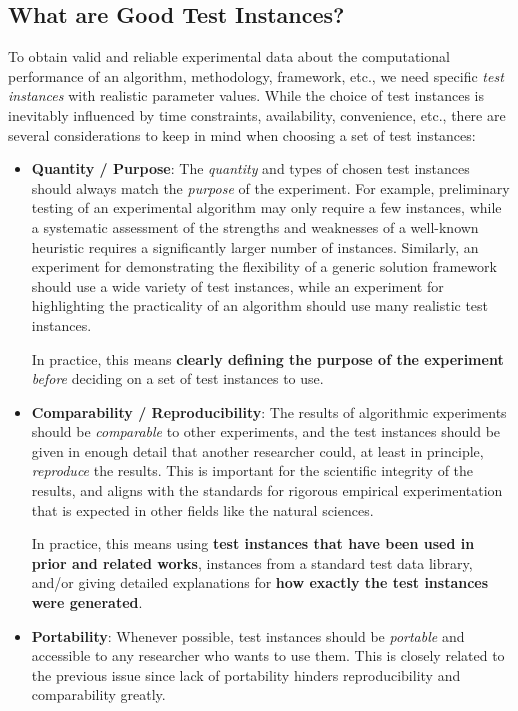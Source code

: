 \documentclass[12pt]{article}
\begin{document}
\subsection{What are Good Test Instances?}
To obtain valid and reliable experimental data about the computational performance of an algorithm, methodology, framework, etc., we need specific \emph{test instances} with realistic parameter values. While the choice of test instances is inevitably influenced by time constraints, availability, convenience, etc., there are several considerations to keep in mind when choosing a set of test instances:
\begin{itemize}
    \item \textbf{Quantity / Purpose}: The \emph{quantity} and types of chosen test instances should always match the \emph{purpose} of the experiment.  For example, preliminary testing of an experimental algorithm may only require a few instances, while a systematic assessment of the strengths and weaknesses of a well-known heuristic requires a significantly larger number of instances.  Similarly, an experiment for demonstrating the flexibility of a generic solution framework should use a wide variety of test instances, while an experiment for highlighting the practicality of an algorithm should use many realistic test instances.

        In practice, this means \textbf{clearly defining the purpose of the experiment} \emph{before} deciding on a set of test instances to use.
    \item \textbf{Comparability / Reproducibility}: The results of algorithmic experiments should be \emph{comparable} to other experiments, and the test instances should be given in enough detail that another researcher could, at least in principle, \emph{reproduce} the results. This is important for the scientific integrity of the results, and aligns with the standards for rigorous empirical experimentation that is expected in other fields like the natural sciences.

        In practice, this means using \textbf{test instances that have been used in prior and related works}, instances from a standard test data library, and/or giving detailed explanations for \textbf{how exactly the test instances were generated}.
    \item \textbf{Portability}: Whenever possible, test instances should be \emph{portable} and accessible to any researcher who wants to use them. This is closely related to the previous issue since lack of portability hinders reproducibility and comparability greatly.


\end{itemize}
\end{document}
